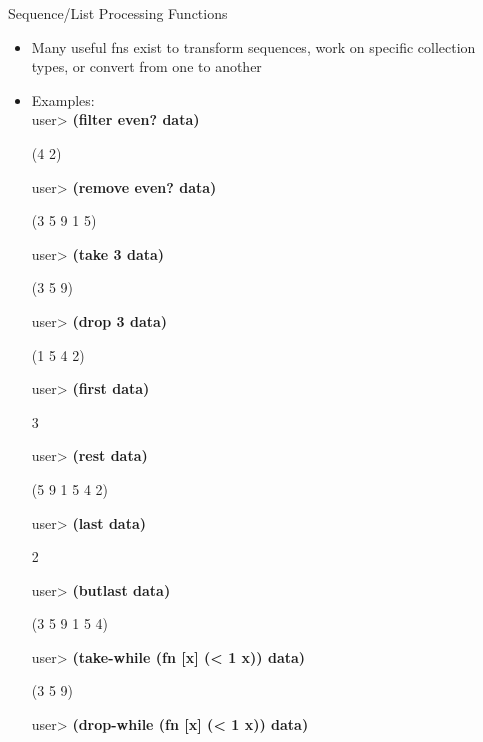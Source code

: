 \documentclass{beamer}
\begin{document}
\begin{frame}[allowframebreaks]{Sequence/List Processing Functions}
  \begin{itemize}
  \item Many useful fns exist to transform sequences, work on specific
    collection types, or convert from one to another
  \item Examples:\\
{\ttfamily\color{black}
\textcolor[rgb]{0.49803922,0.0,0.49803922}{user{\textgreater}
}\textbf{(filter even? data)}}

{\ttfamily\color{black}
(4 2)}

{\ttfamily\color{black}
\textcolor[rgb]{0.49803922,0.0,0.49803922}{user{\textgreater}
}\textbf{(remove even? data)}}

{\ttfamily\color{black}
(3 5 9 1 5)}

{\ttfamily\color{black}
%
\textcolor[rgb]{0.49803922,0.0,0.49803922}{user{\textgreater}
}\textbf{(take 3 data)}}

{\ttfamily\color{black}
(3 5 9)}

{\ttfamily\color{black}
\textcolor[rgb]{0.49803922,0.0,0.49803922}{user{\textgreater}
}\textbf{(drop 3 data)}}

{\ttfamily\color{black}
(1 5 4 2)}

{\ttfamily\color{black}
\textcolor[rgb]{0.49803922,0.0,0.49803922}{user{\textgreater}
}\textbf{(first data)}}

{\ttfamily\color{black}
3}

{\ttfamily\color{black}
\textcolor[rgb]{0.49803922,0.0,0.49803922}{user{\textgreater}
}\textbf{(rest data)}}

{\ttfamily\color{black}
(5 9 1 5 4 2)}

{\ttfamily\color{black}
\textcolor[rgb]{0.49803922,0.0,0.49803922}{user{\textgreater}
}\textbf{(last data)}}

{\ttfamily\color{black}
2}

{\ttfamily\color{black}
\textcolor[rgb]{0.49803922,0.0,0.49803922}{user{\textgreater}
}\textbf{(butlast data)}}

{\ttfamily\color{black}
(3 5 9 1 5 4)}

{\ttfamily\color{black}
\textcolor[rgb]{0.49803922,0.0,0.49803922}{user{\textgreater}
}\textbf{(take-while (fn [x] ({\textless} 1 x)) data)}}

{\ttfamily\color{black}
(3 5 9)}

{\ttfamily\color{black}
\textcolor[rgb]{0.49803922,0.0,0.49803922}{user{\textgreater}
}\textbf{(drop-while (fn [x] ({\textless} 1 x)) data)}}


\end{itemize}
\end{frame}
\end{document}
